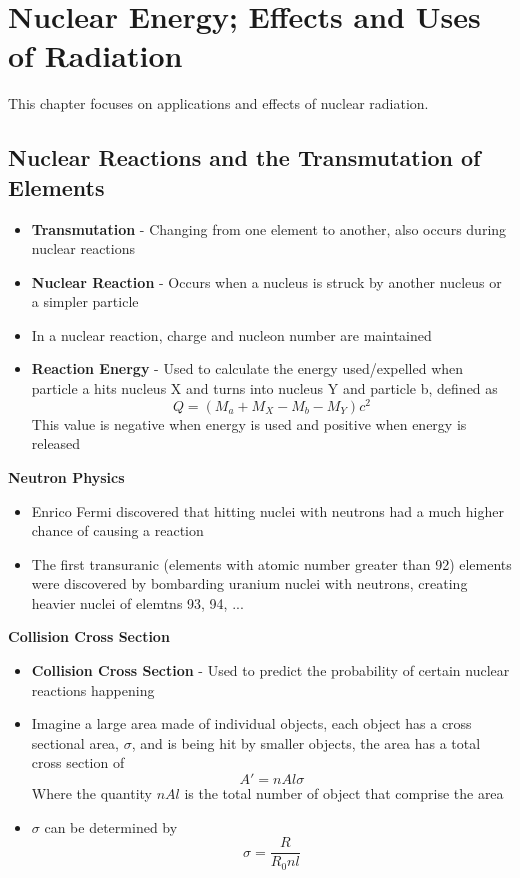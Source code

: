 \section{Nuclear Energy; Effects and Uses of Radiation}
This chapter focuses on applications and effects of nuclear radiation.

\subsection{Nuclear Reactions and the Transmutation of Elements}
\begin{itemize}
    \item \textbf{Transmutation} - Changing from one element to another, also occurs during nuclear reactions
    \item \textbf{Nuclear Reaction} - Occurs when a nucleus is struck by another nucleus or a simpler particle
    \item In a nuclear reaction, charge and nucleon number are maintained
    \item \textbf{Reaction Energy} - Used to calculate the energy used/expelled when particle a hits nucleus X and turns into nucleus Y and particle b, defined as \[Q=(M_a+M_X-M_b-M_Y)c^2\] This value is negative when energy is used and positive when energy is released
\end{itemize}

\textbf{Neutron Physics}
\begin{itemize}
    \item Enrico Fermi discovered that hitting nuclei with neutrons had a much higher chance of causing a reaction
    \item The first transuranic (elements with atomic number greater than 92) elements were discovered by bombarding uranium nuclei with neutrons, creating heavier nuclei of elemtns 93, 94, ...
\end{itemize}

\textbf{Collision Cross Section}
\begin{itemize}
    \item \textbf{Collision Cross Section} - Used to predict the probability of certain nuclear reactions happening
    \item Imagine a large area made of individual objects, each object has a cross sectional area, \(\sigma\), and is being hit by smaller objects, the area has a total cross section of \[A'=nAl\sigma\] Where the quantity \(nAl\) is the total number of object that comprise the area
    \item \(\sigma\) can be determined by \[\sigma=\frac{R}{R_0nl}\]
\end{itemize}

